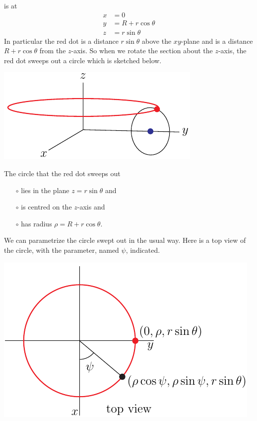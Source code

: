 \begin{eg}[Torus]
is at
\begin{align*}
x&=0 \\
y&= R + r\cos\theta \\
z&= r\sin\theta
\end{align*}
In particular the red dot is a distance $r\sin\theta$ above the $xy$-plane and
is a distance $R + r\cos\theta$ from the $z$-axis. So when we rotate the section about the $z$-axis, the red dot sweeps out a circle
which is sketched below. 
\begin{efig}
\begin{center}
    \includegraphics{torusRotB.pdf}
\end{center}
\end{efig}
The circle that the red dot sweeps out
\begin{itemize}\itemsep1pt \parskip0pt  %
\item[$\circ$]
lies in the plane $z=r\sin\theta$ and
\item[$\circ$]
is centred on the $z$-axis and
\item[$\circ$]
has radius $\rho=R + r\cos\theta$.
\end{itemize}
We can parametrize the circle swept out in the usual way. Here
is a top view of the circle, with the parameter, named $\psi$, indicated. 
\begin{efig}
\begin{center}
    \includegraphics{torusTop.pdf}

\end{center}
\end{efig}
\end{eg}

